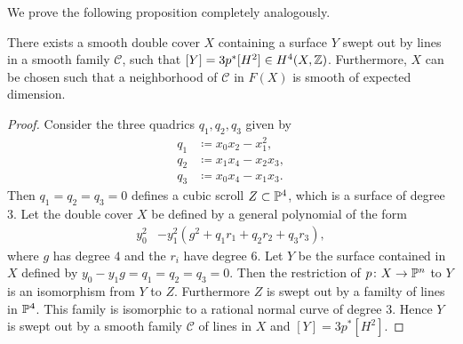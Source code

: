 We prove the following proposition completely analogously.
\begin{proposition}
	\label{prop:Degree3SurfaceSmooth}
  There exists a smooth double cover $X$ containing a surface $Y$ swept out by lines in a smooth family $\mathcal{C}$, such that $[Y] = 3p^*[H^2] \in H^4(X,\Z)$. Furthermore, $X$ can be chosen such that a neighborhood of $\mathcal{C}$ in $F(X)$ is smooth of expected dimension.
\end{proposition}
\begin{proof}
Consider the three quadrics $q_1,q_2,q_3$ given by 
\begin{align*}
  q_1 &\coloneqq x_0x_2 - x_1^2, \\
  q_2 &\coloneqq x_1x_4 - x_2x_3, \\
  q_3 &\coloneqq x_0x_4 - x_1x_3.
\end{align*}
Then $q_1=q_2=q_3=0$ defines a cubic scroll $Z \subset \P^4$, which is a surface of degree 3. 
  Let the double cover $X$ be defined by a general polynomial of the form
  \begin{equation}
  \label{eq:CubicScroll1DoubleCover}
  \begin{split}
  y_0^2 &- y_1^2(g^2 + q_1r_1 
 + q_2r_2 
 + q_3r_3),
 \end{split}
\end{equation}
where $g$ has degree $4$ and the $r_i$ have degree 6. Let $Y$ be the surface contained in $X$ defined by $y_0-y_1g = q_1 = q_2 = q_3 = 0$. Then the restriction of $p \from X \to \P^n$ to $Y$ is an isomorphism from $Y$ to $Z$. Furthermore $Z$ is swept out by a familty of lines in $\P^4$. This family is isomorphic to a rational normal curve of degree 3. Hence $Y$ is swept out by a smooth family $\mathcal{C}$ of lines in $X$ and $[Y] = 3p^*[H^2]$.


\end{proof}
